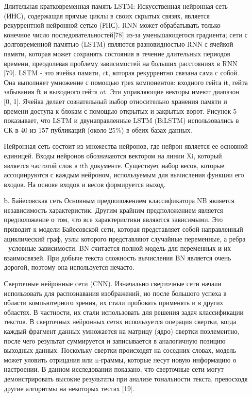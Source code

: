 Длительная кратковременная память LSTM: Искусственная нейронная сеть (ИНС),
содержащая прямые циклы в своих скрытых связях, является рекуррентной нейронной
сетью (РНС). RNN может обрабатывать только конечное число
последовательностей[78] из-за уменьшающегося градиента; сети с долговременной
памятью (LSTM) являются разновидностью RNN с ячейкой памяти, которая может
сохранять состояния в течение длительных периодов времени, преодолевая проблему
зависимостей на больших расстояниях в RNN [79]. LSTM - это ячейка памяти, ct,
которая рекуррентно связана сама с собой. Она выполняет умножение с помощью трех
компонентов: входного гейта it, гейта забывания ft и выходного гейта ot. Эти
управляющие векторы имеют диапазон [0, 1]. Ячейка делает сознательный выбор
относительно хранения памяти и времени доступа к блокам с помощью открытых и
закрытых ворот. Рисунок 5 показывает, что LSTM и двунаправленные LSTM (BiLSTM)
использовались в СК в 40 из 157 публикаций (около 25\%) в обеих базах данных.
\cite{article2}

Нейронная сеть состоит из множества нейронов, где нейрон является ее основной
единицей. Входы нейронов обозначаются вектором на линии Xi, который является
частотой слов в ith документе. Существует набор весов, которые ассоциируются с
каждым нейроном, используемым для вычисления функции его входов. На основе
входов и весов формируется выход.~\cite{article4}

b. Байесовская сеть
Основным предположением классификатора NB является независимость характеристик.
Другим крайним предположением является предположение о том, что все
характеристики являются зависимыми. Это приводит к модели Байесовской сети,
которая представляет собой направленный ациклический граф, узлы которого
представляют случайные переменные, а ребра - условные зависимости. BN считается
полной модель для переменных и их взаимосвязей. При добыче текста сложность
вычисления BN является очень дорогой, поэтому она используется нечасто.
\cite{article4}

Сверточные нейронные сети (CNN). Изначально сверточные сети начали использовать
для распознавания изображений, но после большого успеха в области компьютерного
зрения, их стали пробовать применять и в других областях. В частности, их стали
использовать для решения задач классификации текстов. В сверточных нейронных
сетях используется операция свертки, когда каждый фрагмент данных умножается на
матрицу (ядро) свертки поэлементно, после чего результат суммируется и
записывается в аналогичную позицию выходных данных. Поскольку свертки происходят
на соседних словах, модель может уловить отрицания или n-граммы, которые несут
новую информацию о настроении. В данном исследовании показано, что сверточные
сети могут демонстрировать высокие результаты при анализе тональности текста,
превосходя другие алгоритмы на некоторых тестах [19].~\cite{article9}

